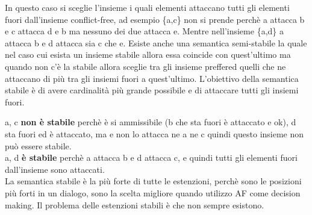 \vspace{0.8cm}

In questo caso si sceglie l’insieme i quali elementi attaccano tutti gli elementi fuori dall’insieme conflict-free, ad esempio \{a,c\} non si prende perchè a attacca b e c attacca d e b ma nessuno dei due attacca e. Mentre nell’insieme \{a,d\} a attacca b e d attacca sia c che e. Esiste anche una semantica semi-stabile la quale nel caso cui esista un insieme stabile allora essa coincide con quest’ultimo ma quando non c’è la stabile allora sceglie tra gli insieme preffered quelli che ne attaccano di più tra gli insiemi fuori a quest’ultimo. L’obiettivo della semantica stabile è di avere cardinalità più grande possibile e di attaccare tutti gli insiemi fuori.

\vspace{0.5cm}

a, c \textbf{non è stabile} perchè è si ammissibile (b che sta fuori è attaccato e ok), d sta fuori ed è attaccato, ma e non lo attacca ne a ne c quindi questo insieme non può essere stabile.
\\a, d \textbf{è stabile} perchè a attacca b e d attacca c, e quindi tutti gli elementi fuori dall’insieme sono attaccati.
\\La semantica stabile è la più forte di tutte le estenzioni, perchè sono le posizioni più forti in un dialogo, sono la scelta migliore quando utilizzo AF come decision making. Il problema delle estenzioni stabili è che non sempre esistono.
